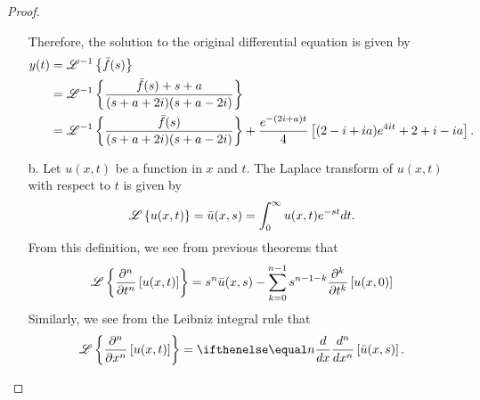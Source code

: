 \begin{proof}
\begin{enumerate}
      Therefore, the solution to the original differential equation is given by
      \begin{align*}
        y(t) &= \mathscr{L}^{-1}\left\{ {\bar{f}(s)} \right\} \\
        &= \mathscr{L}^{-1}\left\{ {\frac{\bar{f}(s) + s + a}{(s+a+2i)(s+a-2i)}} \right\} \\
        &= \mathscr{L}^{-1}\left\{ {\frac{\bar{f}(s)}{(s+a+2i)(s+a-2i)}} \right\} + \frac{e^{-(2i + a) t} }{4} \left[(2-i + ia)e^{4i t} + 2+i -ia\right].
      \end{align*}

    \item[b.]
      Let $u(x, t)$ be a function in $x$ and $t$. The Laplace transform of $u(x, t)$ with respect to $t$ is
      given by
      \begin{align*}
        \mathscr{L}\left\{ {u(x, t)} \right\} = \bar{u}(x, s) = \int_0^\infty u(x, t) e^{-st} dt.
      \end{align*}
      From this definition, we see from previous theorems that
      \begin{align*}
        \mathscr{L}\left\{ {\frac{\partial^n}{\partial t^n}\left[u(x, t)\right]} \right\} = s^n \bar{u}(x, s) - \sum_{k=0}^{n-1}s^{n-1-k} \frac{\partial^k}{\partial t^k}\left[u(x, 0)\right]
      \end{align*}
      Similarly, we see from the Leibniz integral rule that
      \begin{align*}
        \laplace{\frac{\partial^n}{\partial x^n}\left[u(x, t)\right]} = \der{x}{n}\left[\bar{u}(x, s)\right].
      \end{align*}


\end{enumerate}
\end{proof}
